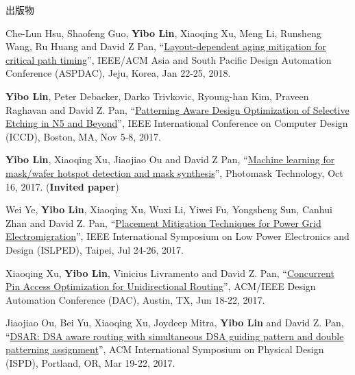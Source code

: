 \begin{rSection}{出版物}
\begin{description}[font=\normalfont, rightmargin=2em]
{}
            

\item[{[C14]}]{
        Che-Lun Hsu, Shaofeng Guo, \textbf{Yibo Lin}, Xiaoqing Xu, Meng Li, Runsheng Wang, Ru Huang and David Z Pan, 
    ``\href{https://doi.org/10.1109/ASPDAC.2018.8297298}{Layout-dependent aging mitigation for critical path timing}'', 
    IEEE/ACM Asia and South Pacific Design Automation Conference (ASPDAC), Jeju, Korea, Jan 22-25, 2018.
    
}
            

\item[{[C13]}]{
        \textbf{Yibo Lin}, Peter Debacker, Darko Trivkovic, Ryoung-han Kim, Praveen Raghavan and David Z. Pan, 
    ``\href{https://doi.org/10.1109/ICCD.2017.72}{Patterning Aware Design Optimization of Selective Etching in N5 and Beyond}'', 
    IEEE International Conference on Computer Design (ICCD), Boston, MA, Nov 5-8, 2017.
    
}
            

\item[{[C12]}]{
        \textbf{Yibo Lin}, Xiaoqing Xu, Jiaojiao Ou and David Z Pan, 
    ``\href{http://dx.doi.org/10.1117/12.2282943}{Machine learning for mask/wafer hotspot detection and mask synthesis}'', 
    Photomask Technology, Oct 16, 2017.
    (\textbf{Invited paper})
}
            

\item[{[C11]}]{
        Wei Ye, \textbf{Yibo Lin}, Xiaoqing Xu, Wuxi Li, Yiwei Fu, Yongsheng Sun, Canhui Zhan and David Z. Pan, 
    ``\href{https://doi.org/10.1109/ISLPED.2017.8009178}{Placement Mitigation Techniques for Power Grid Electromigration}'', 
    IEEE International Symposium on Low Power Electronics and Design (ISLPED), Taipei, Jul 24-26, 2017.
    
}
            

\item[{[C10]}]{
        Xiaoqing Xu, \textbf{Yibo Lin}, Vinicius Livramento and David Z. Pan, 
    ``\href{https://doi.org/10.1145/3061639.3062214}{Concurrent Pin Access Optimization for Unidirectional Routing}'', 
    ACM/IEEE Design Automation Conference (DAC), Austin, TX, Jun 18-22, 2017.
    
}
            

\item[{[C9]}]{
        Jiaojiao Ou, Bei Yu, Xiaoqing Xu, Joydeep Mitra, \textbf{Yibo Lin} and David Z. Pan, 
    ``\href{https://doi.org/10.1145/3036669.3036677}{DSAR: DSA aware routing with simultaneous DSA guiding pattern and double patterning assignment}'', 
    ACM International Symposium on Physical Design (ISPD), Portland, OR, Mar 19-22, 2017.
    
}
\end{description}
\end{rSection}
